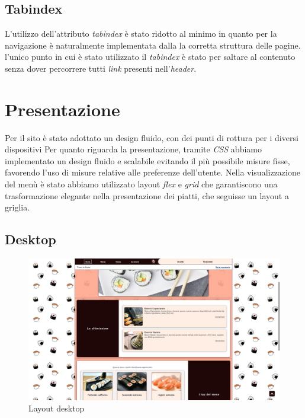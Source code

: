 \documentclass{template}
\begin{document}
	\subsection{Tabindex}
	L'utilizzo dell'attributo \textit{tabindex} è stato ridotto al minimo in quanto per la navigazione è naturalmente implementata dalla la corretta struttura delle pagine. \\
    l'unico punto in cui è stato utilizzato il \textit{tabindex} è stato per saltare al contenuto senza dover percorrere tutti \textit{link} presenti nell'\textit{header}. 

	\section{Presentazione}
	Per il sito è stato adottato un design fluido, con dei punti di rottura per i diversi dispositivi
	Per quanto riguarda la presentazione, tramite \textit{CSS} abbiamo implementato un design fluido e scalabile evitando il più possibile misure fisse, favorendo l'uso di misure relative alle preferenze dell'utente. Nella visualizzazione del menù è stato abbiamo utilizzato layout \textit{flex} e \textit{grid} che garantiscono una trasformazione elegante nella presentazione dei piatti, che seguisse un layout a griglia.

	\subsection{Desktop}
	\begin{figure}[H]
		\centering
		\includegraphics[scale=0.2]{src/layout/desktop.png}
		\caption{Layout desktop}
	\end{figure}
\end{document}
